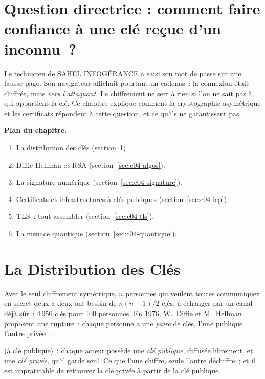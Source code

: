 \section*{Question directrice : comment faire confiance à une clé reçue d'un inconnu~?}

Le technicien de SAHEL INFOGÉRANCE a saisi son mot de passe sur une fausse
page. Son navigateur affichait pourtant un cadenas~: la connexion était
chiffrée, mais \emph{vers l'attaquant}. Le chiffrement ne sert à rien si
l'on ne sait pas à qui appartient la clé. Ce chapitre explique comment la
cryptographie asymétrique et les certificats répondent à cette question,
et ce qu'ils ne garantissent pas.

\medskip
\textbf{Plan du chapitre.}
\begin{enumerate}
    \item La distribution des clés (section~\ref{sec:c04-distribution}).
    \item Diffie-Hellman et RSA (section~\ref{sec:c04-algos}).
    \item La signature numérique (section~\ref{sec:c04-signature}).
    \item Certificats et infrastructures à clés publiques (section~\ref{sec:c04-icp}).
    \item TLS~: tout assembler (section~\ref{sec:c04-tls}).
    \item La menace quantique (section~\ref{sec:c04-quantique}).
\end{enumerate}

\separateur

\section{La Distribution des Clés}
\label{sec:c04-distribution}

Avec le seul chiffrement symétrique, \(n\) personnes qui veulent toutes
communiquer en secret deux à deux ont besoin de \(n(n-1)/2\) clés, à
échanger par un canal déjà sûr~: 4\,950 clés pour 100 personnes. En 1976,
W.~Diffie et M.~Hellman proposent une rupture~: chaque personne a une
\emph{paire} de clés, l'une publique, l'autre privée~\cite{diffie1976}.

\begin{boxdef}
 (à clé publique)~: chaque acteur
possède une \emph{clé publique}, diffusée librement, et une \emph{clé
privée}, qu'il garde seul. Ce que l'une chiffre, seule l'autre déchiffre~;
et il est impraticable de retrouver la clé privée à partir de la clé
publique.
\end{boxdef}

